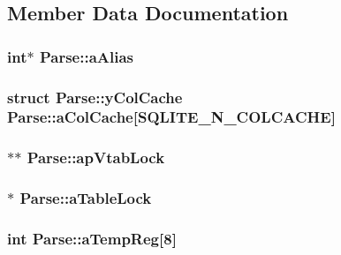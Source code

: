 \subsection{Member Data Documentation}
\hypertarget{struct_parse_a5d59266be4e256238d3bbdf1a9ff7d5b}{
\subsubsection[{a\-Alias}]{\setlength{\rightskip}{0pt plus 5cm}int$\ast$ Parse\-::a\-Alias}}\label{struct_parse_a5d59266be4e256238d3bbdf1a9ff7d5b}
\hypertarget{struct_parse_a788b85979d58b84e06bc367bac5b3f3f}{
\subsubsection[{a\-Col\-Cache}]{\setlength{\rightskip}{0pt plus 5cm}struct {\bf Parse\-::y\-Col\-Cache}  Parse\-::a\-Col\-Cache\mbox{[}{\bf S\-Q\-L\-I\-T\-E\-\_\-\-N\-\_\-\-C\-O\-L\-C\-A\-C\-H\-E}\mbox{]}}}\label{struct_parse_a788b85979d58b84e06bc367bac5b3f3f}
\hypertarget{struct_parse_acdfd318c0f04ec640d6affc85ef8a009}{
\subsubsection[{ap\-Vtab\-Lock}]{$\ast$$\ast$ Parse\-::ap\-Vtab\-Lock}}\label{struct_parse_acdfd318c0f04ec640d6affc85ef8a009}
\hypertarget{struct_parse_ae8e553d660dc69d285945d3db8f127c7}{
\subsubsection[{a\-Table\-Lock}]{$\ast$ Parse\-::a\-Table\-Lock}}\label{struct_parse_ae8e553d660dc69d285945d3db8f127c7}
\hypertarget{struct_parse_ae2bd2e74d0caaab7a741d17b62f01ebc}{
\subsubsection[{a\-Temp\-Reg}]{\setlength{\rightskip}{0pt plus 5cm}int Parse\-::a\-Temp\-Reg\mbox{[}8\mbox{]}}}\label{struct_parse_ae2bd2e74d0caaab7a741d17b62f01ebc}
